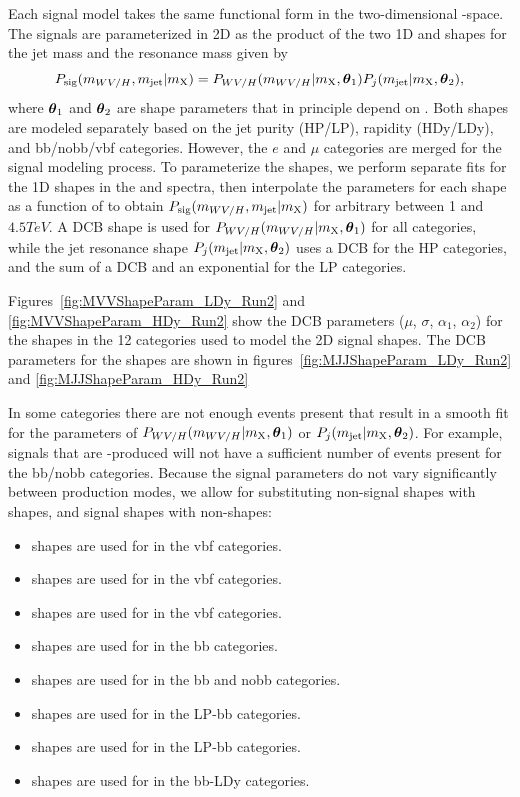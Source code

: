 Each signal model takes the same functional form in the two-dimensional \MJ-\MVV space.
The signals are parameterized in 2D as the product of the two 1D \MJ and \MVV shapes for the jet mass and the resonance mass given by
\begin{equation}
  P_\mathrm{sig}(m_{WV/H},m_\mathrm{jet}|m_\mathrm{X})=P_{WV/H}(m_{WV/H}|m_\mathrm{X},\vb*{\theta}_1)P_j(m_\mathrm{jet}|m_\mathrm{X},\vb*{\theta}_2),
\end{equation}
where $\vb*{\theta}_1$ and $\vb*{\theta}_2$ are shape parameters that in principle depend on \MX.
Both shapes are modeled separately based on the jet purity (HP/LP), rapidity (HDy/LDy), and bb/nobb/vbf categories.
However, the $e$ and $\mu$ categories are merged for the signal modeling process.
To parameterize the shapes, we perform separate fits for the 1D shapes in the \MVV and \MJ spectra, then interpolate the parameters for each shape as a function of \MX to obtain $P_\mathrm{sig}(m_{WV/H},m_\mathrm{jet}|m_\mathrm{X})$ for arbitrary \MX between 1 and $4.5\unit{TeV}$.
A DCB shape is used for $P_{WV/H}(m_{WV/H}|m_\mathrm{X},\vb*{\theta}_1)$ for all categories, while the jet resonance shape $P_j(m_\mathrm{jet}|m_\mathrm{X},\vb*{\theta}_2)$ uses a DCB for the HP categories, and the sum of a DCB and an exponential for the LP categories.

Figures~\ref{fig:MVVShapeParam_LDy_Run2} and \ref{fig:MVVShapeParam_HDy_Run2} show the DCB parameters ($\mu$, $\sigma$, $\alpha_1$, $\alpha_2$) for the \MVV shapes in the 12 categories used to model the 2D signal shapes.
The DCB parameters for the \MJ shapes are shown in figures~\ref{fig:MJJShapeParam_LDy_Run2} and \ref{fig:MJJShapeParam_HDy_Run2}

In some categories there are not enough events present that result in a smooth fit for the parameters of $P_{WV/H}(m_{WV/H}|m_\mathrm{X},\vb*{\theta}_1)$ or $P_j(m_\mathrm{jet}|m_\mathrm{X},\vb*{\theta}_2)$.
For example, signals that are \VBF-produced will not have a sufficient number of events present for the bb/nobb categories.
Because the signal parameters do not vary significantly between production modes, we allow for substituting non-\VBF signal shapes with \VBF shapes, and \VBF signal shapes with non-\VBF shapes:
\begin{itemize}
  \item \VBF\ZprtoWW shapes are used for \DY\ZprtoWW in the vbf categories.
  \item \VBF\WprtoWH shapes are used for \DY\WprtoWH in the vbf categories.
  \item \VBF\WprtoWZ shapes are used for \DY\WprtoWZ in the vbf categories.
  \item \ggF\GBulktoWW shapes are used for \VBF\GBulktoWW in the bb categories.
  \item \DY\WprtoWZ shapes are used for \VBF\WprtoWZ in the bb and nobb categories.
  \item \ggF\RadtoWW shapes are used for \VBF\RadtoWW in the LP-bb categories.
  \item \ggF\GBulktoWW \MJ shapes are used for \DY\ZprtoWW \MJ in the LP-bb categories.
  \item \DY\ZprtoWW shapes are used for \VBF\ZprtoWW in the bb-LDy categories.
\end{itemize}

